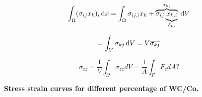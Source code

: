 \documentclass[convergence.tex]{subfiles}
\begin{document}
\begin{equation}
\int_\Omega ( \sigma_{ij} x_k )_i \, \mathrm{d} x = \int_\Omega \sigma_{ij,i} x_k + \overbrace{\sigma_{ij} \underbrace{x_{k,i}}_{\delta_{ki}}}^{\sigma_{kj}} \, \mathrm{d} V 
\end{equation}

\begin{equation}
= \int_V \sigma_{kj} \, \mathrm{d} V = V \overline{\sigma_{kj}}
\end{equation}


\[ \overline{\sigma}_{zz} = \frac{1}{V} \int_\Omega \sigma_{zz} dV = \frac{1}{A} \int_\Gamma F_{z} dA? \]

\textbf{Stress strain curves for different percentage of WC/Co.}
\end{document}

